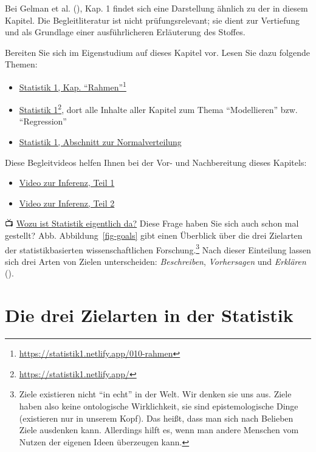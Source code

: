 \documentclass[
  ngerman,
  letterpaper,
  twoside,
  open=any]{scrbook}
\providecommand{\tightlist}{%
  \setlength{\itemsep}{0pt}\setlength{\parskip}{0pt}}\usepackage{longtable,booktabs,array}
\theoremstyle{definition}
\theoremstyle{plain}
\theoremstyle{definition}
\theoremstyle{definition}
\theoremstyle{remark}
\begin{document}
Bei Gelman et al. (), Kap. 1 findet sich
eine Darstellung ähnlich zu der in diesem Kapitel. Die Begleitliteratur
ist nicht prüfungsrelevant; sie dient zur Vertiefung und als Grundlage
einer ausführlicheren Erläuterung des Stoffes.

Bereiten Sie sich im Eigenstudium auf dieses Kapitel vor. Lesen Sie dazu
folgende Themen:

\begin{itemize}
\tightlist
\item
  \href{https://statistik1.netlify.app/010-rahmen}{Statistik 1, Kap.
  \enquote{Rahmen}}\footnote{\url{https://statistik1.netlify.app/010-rahmen}}
\item
  \href{https://statistik1.netlify.app/}{Statistik 1}\footnote{\url{https://statistik1.netlify.app/}},
  dort alle Inhalte aller Kapitel zum Thema \enquote{Modellieren} bzw.
  \enquote{Regression}
\item
  \href{}{Statistik 1, Abschnitt zur Normalverteilung}
\end{itemize}

Diese Begleitvideos helfen Ihnen bei der Vor- und Nachbereitung dieses
Kapitels:

\begin{itemize}
\tightlist
\item
  \href{https://youtu.be/gcwWwBy0kPI}{Video zur Inferenz, Teil 1}
\item
  \href{https://youtu.be/QNMVi6IqQ90}{Video zur Inferenz, Teil 2}
\end{itemize}

📺
\href{https://www.youtube.com/watch?v=gcwWwBy0kPI&list=PLRR4REmBgpIGgz2Oe2Z9FcoLYBDnaWatN&index=2}{Wozu
ist Statistik eigentlich da?} Diese Frage haben Sie sich auch schon mal
gestellt? Abb. Abbildung~\ref{fig-goals} gibt einen Überblick über die
drei Zielarten der statistikbasierten wissenschaftlichen
Forschung.\footnote{Ziele existieren nicht \enquote{in echt} in der
  Welt. Wir denken sie uns aus. Ziele haben also keine ontologische
  Wirklichkeit, sie sind epistemologische Dinge (existieren nur in
  unserem Kopf). Das heißt, dass man sich nach Belieben Ziele ausdenken
  kann. Allerdings hilft es, wenn man andere Menschen vom Nutzen der
  eigenen Ideen überzeugen kann.} Nach dieser Einteilung lassen sich
drei Arten von Zielen unterscheiden: \emph{Beschreiben},
\emph{Vorhersagen} und \emph{Erklären}
().

\section{Die drei Zielarten in der
Statistik}\label{die-drei-zielarten-in-der-statistik}
\end{document}
